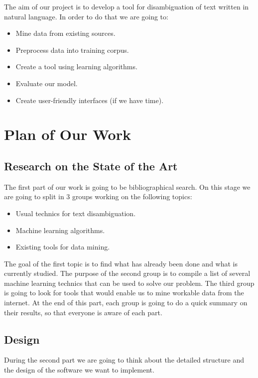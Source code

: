 \documentclass[11pt,a4paper]{article}
\begin{document}
The aim of our project is to develop a tool for disambiguation of text written in natural language. In order to do that we are going to:
\begin{itemize}
	\item Mine data from existing sources.
	\item Preprocess data into training corpus.
	\item Create a tool using learning algorithms.
	\item Evaluate our model.
	\item Create user-friendly interfaces (if we have time).
\end{itemize}

\section{Plan of Our Work}
\subsection{Research on the State of the Art}

The first part of our work is going to be bibliographical search. On this stage we are going to split in 3 groups working on the following topics:
\begin{itemize}
	\item Usual technics for text disambiguation.
	\item Machine learning algorithms.
	\item Existing tools for data mining.
\end{itemize}
The goal of the first topic is to find what has already been done and what is currently studied. The purpose of the second group is to compile a list of several machine learning technics that can be used to solve our problem. The third group is going to look for tools that would enable us to mine workable data from the internet.
At the end of this part, each group is going to do a quick summary on their results, so that everyone is aware of each part.

\subsection{Design}

During the second part we are going to think about the detailed structure and the design of the software we want to implement. 

\end{document}
